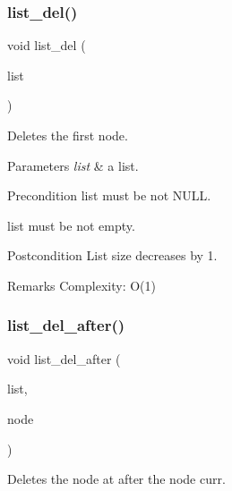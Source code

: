 \subsubsection{list\+\_\+del()}
{\footnotesize\ttfamily void list\+\_\+del (\begin{DoxyParamCaption}\item[{struct \textbf{ list} $\ast$}]{list }\end{DoxyParamCaption})\hspace{0.3cm}{\ttfamily [inline]}}

Deletes the first node.


\begin{DoxyParams}{Parameters}
{\em list} & a list.\\
\hline
\end{DoxyParams}
\begin{DoxyPrecond}{Precondition}
{\ttfamily list} must be not N\+U\+LL. 

{\ttfamily list} must be not empty.
\end{DoxyPrecond}
\begin{DoxyPostcond}{Postcondition}
List size decreases by 1.
\end{DoxyPostcond}
\begin{DoxyRemark}{Remarks}
Complexity\+: O(1) 
\end{DoxyRemark}
\mbox{\label{list_8h_ad301311c004c0b56091e2e89e5a1f5e8}} 
\subsubsection{list\+\_\+del\+\_\+after()}
{\footnotesize\ttfamily void list\+\_\+del\+\_\+after (\begin{DoxyParamCaption}\item[{struct \textbf{ list} $\ast$}]{list,  }\item[{struct \textbf{ list\+\_\+node} $\ast$}]{node }\end{DoxyParamCaption})\hspace{0.3cm}{\ttfamily [inline]}}

Deletes the node at after the node {\ttfamily curr}.



